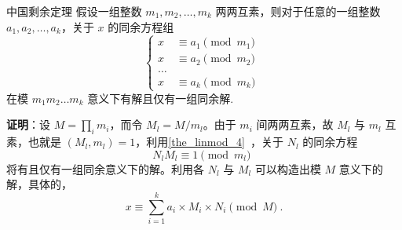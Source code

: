
\begin{theorem}{中国剩余定理}
假设一组整数 $m_1, m_2, \dots, m_k$ 两两互素，则对于任意的一组整数 $a_1, a_2, \dots, a_k$，关于 $x$ 的同余方程组
\begin{equation}\left\{
\begin{aligned}
x &\equiv a_1 \pmod{m_1} \\
x &\equiv a_2 \pmod{m_2} \\
\dots   \\
x &\equiv a_k \pmod{m_k}
\end{aligned}\right. ~~
\end{equation}
在模 $m_1m_2\dots m_k$ 意义下有解且仅有一组同余解.
\end{theorem}
\textbf{证明}：设 $M = \prod_i m_i$，而令 $M_l = M / m_l$。由于 $m_i$ 间两两互素，故 $M_l$ 与 $m_l$ 互素，也就是 $(M_l, m_l) = 1$，利用\autoref{the_linmod_4}~，关于 $N_l$ 的同余方程
\begin{equation}
N_l M_l \equiv 1 \pmod{m_l} ~~
\end{equation}
将有且仅有一组同余意义下的解。利用各 $N_l$ 与 $M_l$ 可以构造出模 $M$ 意义下的解，具体的，
\begin{equation}
x \equiv  \sum_{i=1}^k a_i \times M_i \times N_i \pmod{M} ~.
\end{equation}

